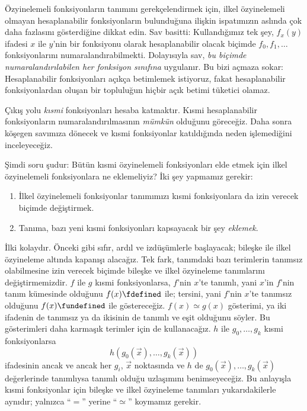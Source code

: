 \documentclass[../../../include/open-logic-section]{subfiles}
\begin{document}

Özyinelemeli fonksiyonların tanımını gerekçelendirmek için, ilkel
özyinelemeli olmayan hesaplanabilir fonksiyonların bulunduğuna ilişkin
ispatımızın aslında çok daha fazlasını gösterdiğine dikkat edin. Sav basitti:
Kullandığımız tek şey, $f_x(y)$ ifadesi $x$ ile $y$'nin bir fonksiyonu olarak
hesaplanabilir olacak biçimde $f_0,f_1,\dots$ fonksiyonlarını
numaralandırabilmekti. Dolayısıyla sav, \emph{bu biçimde numaralandırılabilen
her fonksiyon sınıfına} uygulanır. Bu bizi açmaza sokar: Hesaplanabilir
fonksiyonları açıkça betimlemek istiyoruz, fakat hesaplanabilir
fonksiyonlardan oluşan bir topluluğun hiçbir açık betimi tüketici olamaz.

Çıkış yolu \emph{kısmi} fonksiyonları hesaba katmaktır. Kısmi hesaplanabilir
fonksiyonların numaralandırılmasının \emph{mümkün} olduğunu göreceğiz.
 Daha sonra köşegen savımıza dönecek ve kısmi fonksiyonlar
katıldığında neden işlemediğini inceleyeceğiz.

Şimdi soru şudur: Bütün kısmi özyinelemeli fonksiyonları elde etmek için
ilkel özyinelemeli fonksiyonlara ne eklemeliyiz? İki şey yapmamız gerekir:
\begin{enumerate}
\item İlkel özyinelemeli fonksiyonlar tanımımızı kısmi fonksiyonlara da izin
  verecek biçimde değiştirmek.
\item Tanıma, bazı yeni kısmi fonksiyonları kapsayacak bir şey
  \emph{eklemek}.
\end{enumerate}

İlki kolaydır. Önceki gibi sıfır, ardıl ve izdüşümlerle başlayacak; bileşke
ile ilkel özyineleme altında kapanışı alacağız. Tek fark, tanımdaki bazı
terimlerin tanımsız olabilmesine izin verecek biçimde bileşke ve ilkel
özyineleme tanımlarını değiştirmemizdir. $f$ ile $g$ kısmi fonksiyonlarsa,
$f$'nin $x$'te tanımlı, yani $x$'in $f$'nin tanım kümesinde olduğunu
$f(x)\fdefined$ ile; tersini, yani $f$'nin $x$'te tanımsız olduğunu
$f(x)\fundefined$ ile göstereceğiz. $f(x)\simeq g(x)$ gösterimi, ya iki
ifadenin de tanımsız ya da ikisinin de tanımlı ve eşit olduğunu söyler. Bu
gösterimleri daha karmaşık terimler için de kullanacağız. $h$ ile
$g_0,\dots,g_k$ kısmi fonksiyonlarsa
\[
  h(g_0(\vec x),\dots,g_k(\vec x))
\]
ifadesinin ancak ve ancak her $g_i$, $\vec x$ noktasında ve $h$ de
$g_0(\vec x),\dots,g_k(\vec x)$ değerlerinde tanımlıysa tanımlı olduğu
uzlaşımını benimseyeceğiz. Bu anlayışla kısmi fonksiyonlar için bileşke ve
ilkel özyineleme tanımları yukarıdakilerle aynıdır; yalnızca ``$=$'' yerine
``$\simeq$'' koymamız gerekir.
\end{document}
